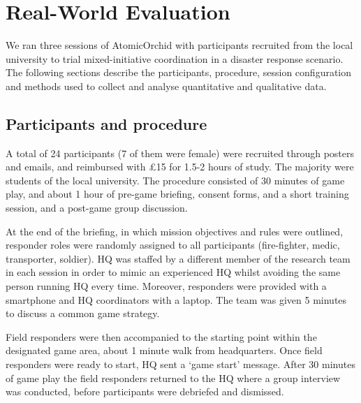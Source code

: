 \section{Real-World Evaluation}\label{sec:evaluation}
\noindent We ran three sessions of AtomicOrchid with participants recruited from the local university to trial mixed-initiative coordination in a disaster response scenario. The following sections describe the participants, procedure, session configuration and methods used to collect and analyse quantitative and qualitative data.

\subsection{Participants and procedure}
\noindent  A total of 24 participants (7 of them were female) were recruited through posters and emails, and reimbursed with \pounds 15  for 1.5-2 hours of study. The majority were students of the local university. The procedure consisted of 30 minutes of game play, and about 1 hour of pre-game briefing, consent forms, and a short training session, and a post-game group discussion. 


At the end of the briefing, in which mission objectives and rules were outlined, responder roles were randomly assigned to all participants (fire-fighter, medic, transporter, soldier). HQ was staffed by a different member of the research team in each session in order to mimic an experienced HQ whilst avoiding the same person running HQ every time.  Moreover, responders were provided with a smartphone and HQ coordinators with a laptop. The team was given 5 minutes to discuss a common game strategy. 


Field responders were then accompanied to the starting point within the designated game area, about 1 minute walk from headquarters. Once field responders were ready to start, HQ sent a `game start' message. After 30 minutes of game play the field responders returned to the HQ where a group interview was conducted, before participants were debriefed and dismissed.

